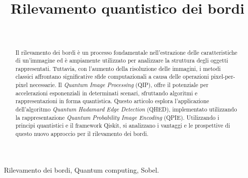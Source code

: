 \documentclass[journal]{IEEEtran}
\begin{document}
\title{Rilevamento quantistico dei bordi}

\author{
\\

}

\maketitle

\begin{abstract}
	Il rilevamento dei bordi è un processo fondamentale nell'estrazione delle 
	caratteristiche di un'immagine ed è ampiamente utilizzato per analizzare 
	la struttura degli oggetti rappresentati. Tuttavia, con l'aumento della 
	risoluzione delle immagini, i metodi classici affrontano significative 
	sfide computazionali a causa delle operazioni pixel-per-pixel necessarie. 
	Il \emph{Quantum Image Processing} (QIP), offre il potenziale per accelerazioni 
	esponenziali in determinati scenari, sfruttando algoritmi e rappresentazioni 
	in forma quantistica. Questo articolo esplora l'applicazione dell'algoritmo 
	\emph{Quantum Hadamard Edge Detection} (QHED), implementato utilizzando la 
	rappresentazione \emph{Quantum Probability Image Encoding} (QPIE). 
	Utilizzando i principi quantistici e il framework Qiskit, si analizzano 
	i vantaggi e le prospettive di questo nuovo approccio per il rilevamento dei bordi.
\end{abstract}

\begin{IEEEkeywords}
Rilevamento dei bordi, Quantum computing, Sobel.
\end{IEEEkeywords}









\end{document}
